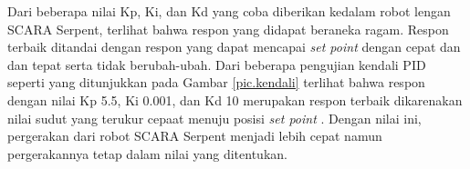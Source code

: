 Dari beberapa nilai Kp, Ki, dan Kd yang coba diberikan kedalam robot lengan SCARA Serpent, terlihat bahwa respon yang didapat beraneka ragam. Respon terbaik ditandai dengan respon yang dapat mencapai \textit{set point} dengan cepat dan dan tepat serta tidak berubah-ubah. Dari beberapa pengujian kendali PID seperti yang ditunjukkan pada Gambar \ref{pic.kendali} terlihat bahwa respon dengan nilai Kp 5.5, Ki 0.001, dan Kd 10 merupakan respon terbaik dikarenakan nilai sudut yang terukur cepaat menuju posisi \textit{set point }. Dengan nilai ini, pergerakan dari robot SCARA Serpent menjadi lebih cepat namun pergerakannya tetap dalam nilai yang ditentukan.



